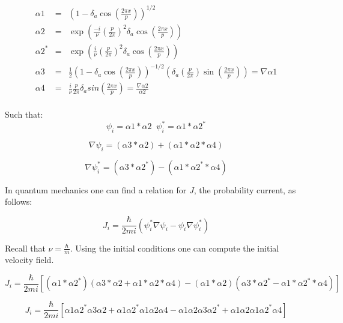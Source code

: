 \begin{eqnarray}
\alpha 1 & = & \left(1- \delta_a \cos\left(\frac{2 \pi x}{p}\right)\right)^{1/2} \\ \nonumber
\alpha 2 & = & \exp\left(\frac{-i}{\nu}(\frac{p}{2\pi})^2 \delta_a \cos\left(\frac{2 \pi x}{p} \right) \right) \\ \nonumber
\alpha 2^* & = & \exp\left(\frac{i}{\nu}(\frac{p}{2\pi})^2 \delta_a \cos\left(\frac{2 \pi x}{p} \right) \right) \\ \nonumber
\alpha 3 & = & \frac{1}{2}\left(1-\delta_a \cos\left(\frac{2 \pi x}{p}\right)\right)^{-1/2} \left(\delta_a(\frac{p}{2\pi}) \sin\left(\frac{2\pi x}{p}\right)\right) = \nabla\alpha 1 \\ \nonumber
\alpha 4 & = & \frac{i}{\nu} \frac{p}{2 \pi} \delta_a sin\left(\frac{2\pi x}{p}\right) = \frac{\nabla\alpha2}{\alpha2}\\ \nonumber
\end{eqnarray}

Such that:
\begin{equation}
 \psi_i = \alpha 1 * \alpha 2  \; \;  \psi_i^* = \alpha 1 * \alpha 2^* 
\end{equation}

\begin{equation}
\nabla\psi_i = (\alpha 3* \alpha 2) + (\alpha 1 * \alpha 2 * \alpha 4)
\end{equation}

\begin{equation}
\nabla\psi_i^* = (\alpha 3* \alpha 2^*) - (\alpha 1 * \alpha 2^* * \alpha 4)
\end{equation}

In quantum mechanics one can find a relation for $J$, the probability current, as follows:

\begin{equation}
 J_i = \frac{\hbar}{2mi} (\psi_i^* \nabla \psi_i - \psi_i \nabla \psi_i^*)
\end{equation}

Recall that $\nu = \frac{\hbar}{m}$. Using the initial conditions one can compute the initial velocity field.

\begin{equation}
 J_i = \frac{\hbar}{2mi} [(\alpha 1 * \alpha 2^*) (\alpha 3* \alpha 2 + \alpha 1 * \alpha 2 * \alpha 4) - (\alpha 1 * \alpha 2 )(\alpha 3* \alpha 2^* - \alpha 1 * \alpha 2^* * \alpha 4)]
\end{equation}

\begin{equation}
 J_i = \frac{\hbar}{2mi}
[\alpha 1\alpha 2^*\alpha 3\alpha 2 + \alpha 1\alpha 2^*\alpha 1\alpha 2\alpha 4 - \alpha 1\alpha 2\alpha 3\alpha 2^* + \alpha 1\alpha 2\alpha 1\alpha 2^*\alpha 4]
\end{equation}

